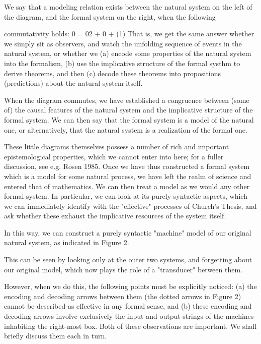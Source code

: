 \documentclass[a4paper,12pt]{article}
\begin{document}
We say that a modeling relation exists between the natural system on the left of the diagram, and the formal system on the right, when the following

commutativity holds:
0 = 02 + 0 + 	(1)
That is, we get the same answer whether we simply sit as observers, and watch the unfolding sequence of events in the natural system,
or whether we
(a) encode some properties of the natural system into the formalism,
(b) use the implicative structure of the formal systhm to derive theorems,
and then (c) decode these theorems into propositions (predictions) about the natural system itself.

When the diagram commutes, we have established a congruence between (some of) the causal features of the natural system and the implicative structure of the formal system.
We can then say that the formal system is a model of the natural one, or alternatively, that the natural system is a realization of the formal one.

These little diagrams themselves possess a number of rich and important epistemological properties, which we cannot enter into here; for a fuller discussion, see e.g. Rosen 1985.
Once we have thus constructed a formal system which is a model for
some natural process, we have left the realm of science and entered that
of mathematics. We can then treat a model as we would any other formal
system. In particular, we can look at its purely syntactic aspects, which we can immediately identify with the "effective" processes of Church's Thesis,
and ask whether these exhaust the implicative resources of the system itself.

In this way, we can construct a purely syntactic "machine" model of our original natural system, as indicated in Figure 2.

This can be seen by looking only at the outer two systems, and forgetting about our original model, which now plays the role of a "transducer"
between them.

However, when we do this, the following points must be explicitly noticed: (a) the encoding and decoding arrows between them (the
dotted arrows in Figure 2) cannot be described as effective in any formal
sense, and (b) these encoding and decoding arrows involve exclusively the
input and output strings of the machines inhabiting the right-most box. Both
of these observations are important. We shall briefly discuss them each in
turn.
\end{document}

